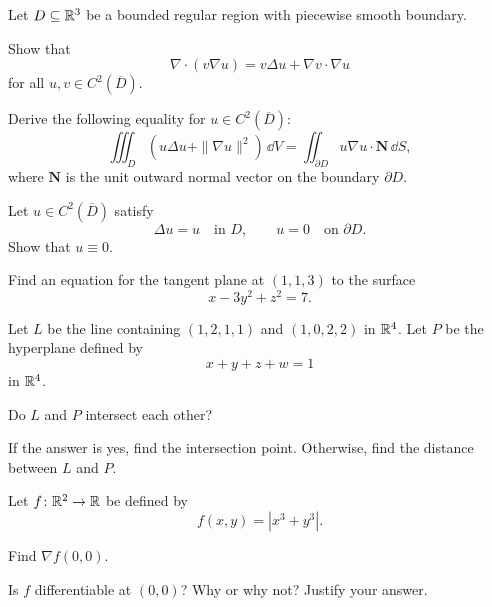 \begin{problem}
Let $D\subseteq\mathbb{R}^3$ be a bounded regular region with piecewise smooth boundary.
\begin{problemsubparts}
\item Show that
\[
\nabla\cdot(v\nabla u)=v\Delta u+\nabla v\cdot\nabla u
\]
for all $u, v\in C^2(\overline D)$.
\item Derive the following equality for $u\in C^2(\overline D)$:
\[
\iiint_D\left(u\Delta u+\|\nabla u\|^2\right)\,\dd V
=
\iint_{\partial D}u\nabla u\cdot\mathbf N\,\dd S,
\]
where $\mathbf N$ is the unit outward normal vector on the boundary $\partial D$.
\item Let $u\in C^2(\overline D)$ satisfy
\[
\Delta u=u\quad\text{in }D,
\qquad
u=0\quad\text{on }\partial D.
\]
Show that $u\equiv0$.
\end{problemsubparts}
\end{problem}

\begin{problem}
Find an equation for the tangent plane at $(1, 1, 3)$ to the surface
\[
x-3y^2+z^2=7.
\]
\end{problem}

\begin{problem}
Let $L$ be the line containing $(1, 2, 1, 1)$ and $(1, 0, 2, 2)$ in $\mathbb{R}^4$. Let $P$ be the hyperplane defined by
\[
x+y+z+w=1
\]
in $\mathbb{R}^4$.
\begin{problemsubparts}
\item Do $L$ and $P$ intersect each other?
\item If the answer is yes, find the intersection point. Otherwise, find the distance between $L$ and $P$.
\end{problemsubparts}
\end{problem}

\begin{problem}
Let $f\colon\mathbb{R}^2\to\mathbb{R}$ be defined by
\[
f(x, y)=|x^3+y^3|.
\]
\begin{problemsubparts}
\item Find $\nabla f(0, 0)$.
\item Is $f$ differentiable at $(0, 0)$? Why or why not? Justify your answer.
\end{problemsubparts}
\end{problem}

